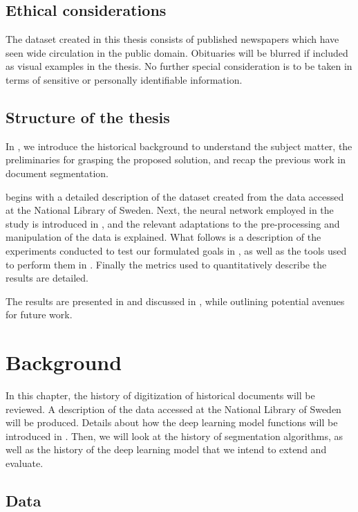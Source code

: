 \documentclass[oneside, english, bibtex]{kththesis}
\begin{document}
\section{Ethical considerations}

The dataset created in this thesis consists of published newspapers which have seen wide circulation in the public domain. 
Obituaries will be blurred if included as visual examples in the thesis. No further special consideration is to be taken in terms of sensitive or personally identifiable information.

\section{Structure of the thesis}

In , we introduce the historical background to understand the subject matter, the preliminaries for grasping the proposed solution, and recap the previous work in document segmentation.

 begins with a detailed description of the dataset created from the data accessed at the National Library of Sweden.
Next, the neural network employed in the study is introduced in , and the relevant adaptations to the pre-processing and manipulation of the data is explained.
What follows is a description of the experiments conducted to test our formulated goals in , as well as the tools used to perform them in .
Finally the metrics used to quantitatively describe the results are detailed.

The results are presented in  and discussed in ,
while outlining potential avenues for future work.

\cleardoublepage
\chapter{Background}
\label{ch:background}

In this chapter, the history of digitization of historical documents will be reviewed. A description of the data accessed at the National Library of Sweden will be produced. Details about how the deep learning model functions will be introduced in . Then, we will look at the history of segmentation algorithms, as well as the history of the deep learning model that we intend to extend and evaluate. 

\section{Data}
\end{document}
